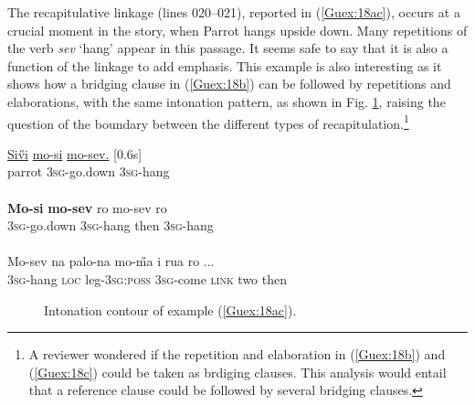 \documentclass[output=paper]{LSP/langsci}
\begin{document}
The recapitulative linkage (lines 020--021), reported in (\ref{Guex:18ac}), occurs at a crucial moment in the story, when Parrot hangs upside down. Many repetitions of the verb \textit{sev} `hang' appear in this passage. It seems safe to say that it is also a function of the linkage to add emphasis. This example is also interesting as it shows how a bridging clause in (\ref{Guex:18b}) can be followed by repetitions and elaborations, with the same intonation pattern, as shown in Fig. \ref{GuF7}, raising the question of the boundary between the different types of recapitulation.\footnote{A reviewer wondered if the repetition and elaboration in (\ref{Guex:18b}) and (\ref{Guex:18c}) could be taken as brdiging clauses. This analysis would entail that a reference clause could be followed by several bridging clauses.}

\begin{exe}
\ex \label{Guex:18ac}
\begin{xlist}
\ex \label{Guex:18a}
\gll \underline{Si\H{v}i}  \underline{mo-si}           \underline{mo-sev.}           [0.6s]\\
parrot  \textsc{3sg}-go.down   \textsc{3sg}-hang \\
\glt {}\\
\ex \label{Guex:18b}
\gll \textbf{Mo-si}          \textbf{mo-sev}       ro              mo-sev       ro\\
\textsc{3sg}-go.down   \textsc{3sg}-hang   then  \textsc{3sg}-hang\\
\glt {}\\
\ex \label{Guex:18c}
\gll   Mo-sev    na     palo-na           mo-\H{m}a        i     rua   ro  ...\\     	       
\textsc{3sg}-hang  \textsc{loc}    leg-\textsc{3sg:poss}   \textsc{3sg}-come  \textsc{link}   two   then \\
\glt {} 
\end{xlist}
\end{exe}

\begin{figure}[ht]
\caption{Intonation contour of example (\ref{Guex:18ac}). \label{GuF7}}
\end{figure}
\end{document}
